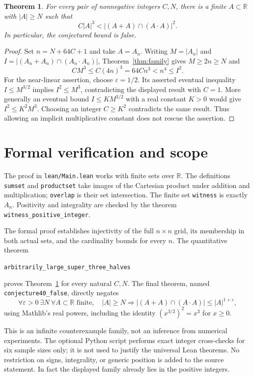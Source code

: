 \documentclass[11pt]{article}
\newtheorem{theorem}{Theorem}
\newcommand{\R}{\mathbb R}
\begin{document}
\begin{theorem}\label{thm:asymptotic}
For every pair of nonnegative integers $C,N$, there is a finite $A\subset\R$ with $|A|\ge N$ such that
\[
 C|A|^3<|(A+A)\cap(A\cdot A)|^2.
\]
In particular, the conjectured bound is false.
\end{theorem}
\begin{proof}
Set $n=N+64C+1$ and take $A=A_n$. Writing $M=|A_n|$ and $I=|(A_n+A_n)\cap(A_n\cdot A_n)|$, Theorem~\ref{thm:family} gives $M\ge2n\ge N$ and
\[
 CM^3\le C(4n)^3=64Cn^3<n^4\le I^2.
\]
For the near-linear assertion, choose $\varepsilon=1/2$. Its asserted eventual inequality $I\le M^{3/2}$ implies $I^2\le M^3$, contradicting the displayed result with $C=1$. More generally an eventual bound $I\le K M^{3/2}$ with a real constant $K>0$ would give $I^2\le K^2 M^3$. Choosing an integer $C\ge K^2$ contradicts the same result. Thus allowing an implicit multiplicative constant does not rescue the assertion.
\end{proof}

\section*{Formal verification and scope}
The proof in \texttt{lean/Main.lean} works with finite sets over $\R$. The definitions \texttt{sumset} and \texttt{productset} take images of the Cartesian product under addition and multiplication; \texttt{overlap} is their set intersection. The finite set \texttt{witness} is exactly $A_n$. Positivity and integrality are checked by the theorem \texttt{witness\_positive\_integer}.

The formal proof establishes injectivity of the full $n\times n$ grid, its membership in both actual sets, and the cardinality bounds for every $n$. The quantitative theorem
\begin{center}\small\texttt{arbitrarily\_large\_super\_three\_halves}\end{center}
proves Theorem~\ref{thm:asymptotic} for every natural $C,N$. The final theorem, named \texttt{conjecture40\_false}, directly negates
\[
 \forall\varepsilon>0\ \exists N\ \forall A\subset\R\text{ finite},\quad
 |A|\ge N\Longrightarrow |(A+A)\cap(A\cdot A)|\le |A|^{1+\varepsilon},
\]
using Mathlib's real powers, including the identity $(x^{3/2})^2=x^3$ for $x\ge0$.

This is an infinite counterexample family, not an inference from numerical experiments. The optional Python script performs exact integer cross-checks for six sample sizes only; it is not used to justify the universal Lean theorems. No restriction on signs, integrality, or generic position is added to the source statement. In fact the displayed family already lies in the positive integers.
\end{document}
